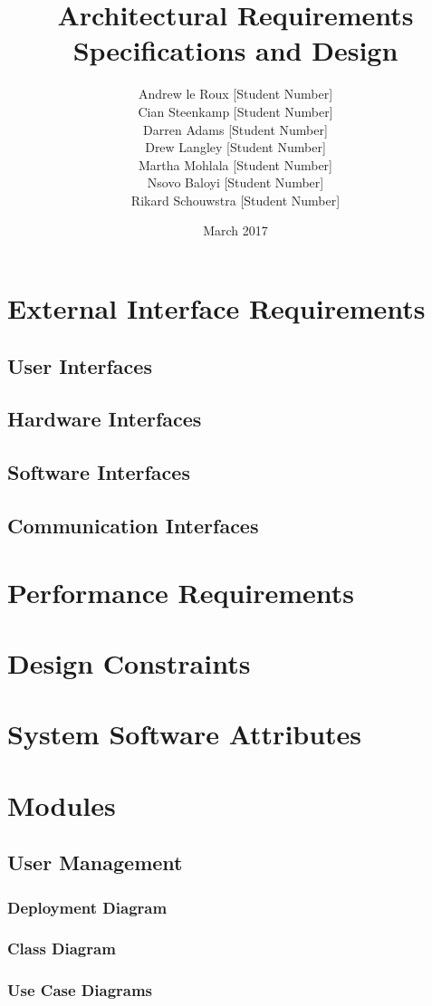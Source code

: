 \documentclass{article}
\title{Architectural Requirements Specifications and Design}
\author{Andrew le Roux \hfill [Student Number] \\ Cian Steenkamp \hfill [Student Number] \\ Darren Adams \hfill [Student Number] \\ Drew Langley \hfill [Student Number] \\ Martha Mohlala \hfill [Student Number] \\ Nsovo Baloyi \hfill [Student Number] \\ Rikard Schouwstra \hfill [Student Number]}
\date{March 2017}
\begin{document}
\maketitle
\pagebreak
\tableofcontents
\pagebreak
\section{External Interface Requirements}
    \subsection{User Interfaces}
    \subsection{Hardware Interfaces}
    \subsection{Software Interfaces}
    \subsection{Communication Interfaces}
\section{Performance Requirements}
\section{Design Constraints}
\section{System Software Attributes}
\section{Modules}
    \subsection{User Management}
        \subsubsection{Deployment Diagram}
        \subsubsection{Class Diagram}
        \subsubsection{Use Case Diagrams}
\end{document}
